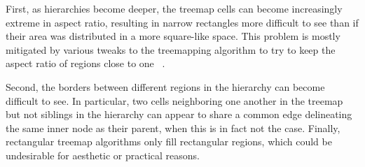 \documentclass{acm_proc_article-sp} \usepackage{cite}
\begin{document}
First, as hierarchies become deeper, the treemap cells can become
increasingly extreme in aspect ratio, resulting in narrow rectangles
more difficult to see than if their area was distributed in a more
square-like space. This problem is mostly mitigated by various tweaks
to the treemapping algorithm to try to keep the aspect ratio of
regions close to one ~\cite{balzer:treemaps}.

Second, the borders between different regions in the hierarchy can
become difficult to see. In particular, two cells neighboring one
another in the treemap but not siblings in the hierarchy can appear to
share a common edge delineating the same inner node as their parent,
when this is in fact not the case.  Finally, rectangular treemap
algorithms only fill rectangular regions, which could be
undesirable for aesthetic or practical reasons.


%
\end{document}
